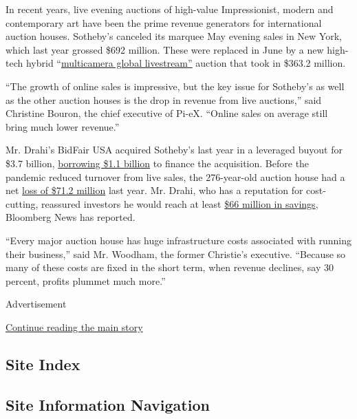 In recent years, live evening auctions of high-value Impressionist,
modern and contemporary art have been the prime revenue generators for
international auction houses. Sotheby's canceled its marquee May evening
sales in New York, which last year grossed \$692 million. These were
replaced in June by a new high-tech hybrid
``\href{https://www.nytimes3xbfgragh.onion/2020/06/30/arts/design/sothebys-online-auction.html}{multicamera
global livestream''} auction that took in \$363.2 million.

``The growth of online sales is impressive, but the key issue for
Sotheby's as well as the other auction houses is the drop in revenue
from live auctions,'' said Christine Bouron, the chief executive of
Pi-eX. ``Online sales on average still bring much lower revenue.''

Mr. Drahi's BidFair USA acquired Sotheby's last year in a leveraged
buyout for \$3.7 billion,
\href{https://www.gazette-drouot.com/article/the-new-sotheby-s-is-coming/11785}{borrowing
\$1.1 billion} to finance the acquisition. Before the pandemic reduced
turnover from live sales, the 276-year-old auction house had a net
\href{https://www.sothebys.com/content/dam/sothebys/PDFs/Sothebys-Annual-Report-12.31.2019.pdf}{loss
of \$71.2 million} last year. Mr. Drahi, who has a reputation for
cost-cutting, reassured investors he would reach at least
\href{https://www.bloomberg.com/news/articles/2019-11-01/billionaire-s-light-touch-approach-at-sotheby-s-faces-first-test}{\$66
million in savings}, Bloomberg News has reported.

``Every major auction house has huge infrastructure costs associated
with running their business,'' said Mr. Woodham, the former Christie's
executive. ``Because so many of these costs are fixed in the short term,
when revenue declines, say 30 percent, profits plummet much more.''

Advertisement

\protect\hyperlink{after-bottom}{Continue reading the main story}

\hypertarget{site-index}{%
\subsection{Site Index}\label{site-index}}

\hypertarget{site-information-navigation}{%
\subsection{Site Information
Navigation}\label{site-information-navigation}}

